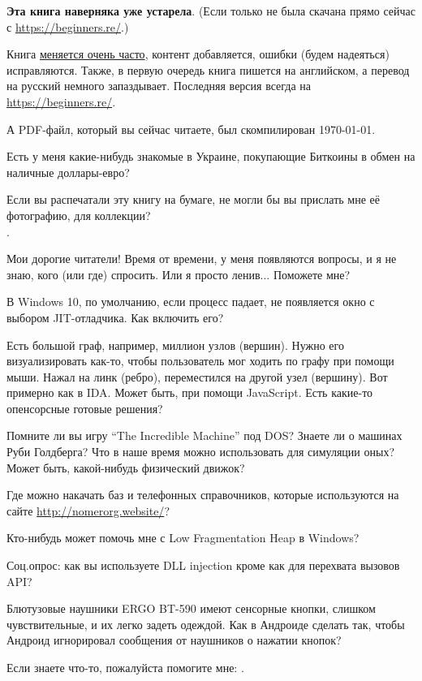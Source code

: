         \myhrule{}

\textbf{Эта книга наверняка уже устарела}.
(Если только не была скачана прямо сейчас с \url{https://beginners.re/}.)

Книга \href{\RepoURL/ChangeLog}{меняется очень часто},
контент добавляется, ошибки (будем надеяться) исправляются.
Также, в первую очередь книга пишется на английском, а перевод на русский немного запаздывает.
Последняя версия всегда на \url{https://beginners.re/}.

А PDF-файл, который вы сейчас читаете, был скомпилирован \today{}.

\myhrule{}

Есть у меня какие-нибудь знакомые в Украине, покупающие Биткоины в обмен на наличные доллары-евро?

\myhrule{}

Если вы распечатали эту книгу на бумаге, не могли бы вы прислать мне её фотографию, для коллекции?\\
\EMAILS{}.

\myhrule{}

Мои дорогие читатели! Время от времени, у меня появляются вопросы, и я не знаю, кого (или где) спросить.
Или я просто ленив...
Поможете мне?

\myhrule{}

В Windows 10, по умолчанию, если процесс падает, не появляется окно с выбором JIT-отладчика.
Как включить его?

\myhrule{}

Есть большой граф, например, миллион узлов (вершин).
Нужно его визуализировать как-то, чтобы пользователь мог ходить по графу при помощи мыши.
Нажал на линк (ребро), переместился на другой узел (вершину).
Вот примерно как в IDA.
Может быть, при помощи JavaScript.
Есть какие-то опенсорсные готовые решения?

\myhrule{}

Помните ли вы игру ``The Incredible Machine'' под DOS?
Знаете ли о машинах Руби Голдберга?
Что в наше время можно использовать для симуляции оных?
Может быть, какой-нибудь физический движок?

\myhrule{}

Где можно накачать баз и телефонных справочников, которые используются на сайте \url{http://nomerorg.website/}?

\myhrule{}

Кто-нибудь может помочь мне с Low Fragmentation Heap в Windows?

\myhrule{}

Соц.опрос: как вы используете DLL injection кроме как для перехвата вызовов API?

\myhrule{}

Блютузовые наушники ERGO BT-590 имеют сенсорные кнопки, слишком чувствительные, и их легко задеть одеждой.
Как в Андроиде сделать так, чтобы Андроид игнорировал сообщения от наушников о нажатии кнопок?

\myhrule{}

Если знаете что-то, пожалуйста помогите мне: \EMAILS{}.

